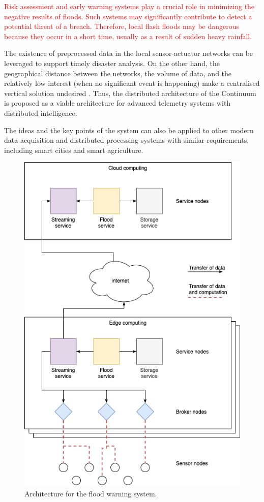 \textcolor{red}{Risk assessment and early warning systems play a crucial role in minimizing the negative results of floods. Such systems may significantly contribute to detect a potential threat of a breach. Therefore, local flash floods may be dangerous because they occur in a short time, usually as a result of sudden heavy rainfall.}

The existence of preprocessed data in the local sensor-actuator networks can be leveraged to support timely disaster analysis. On the other hand, the geographical distance between the networks, the volume of data, and the relatively low interest (when no significant event is happening) make a centralised vertical solution undesired \cite{balouek2019towards}. Thus, the distributed architecture of the Continuum is proposed as a viable architecture for advanced telemetry systems with distributed intelligence.

The ideas and the key points of the system can also be applied to other modern data acquisition and distributed processing systems with similar requirements, including smart cities and smart agriculture.

\begin{figure}[ht]
\centering
\includegraphics[width=\columnwidth]{figures/architecture-levee2}
\caption{Architecture for the flood warning system.}
\label{fig:architecture-levee}
\end{figure}

